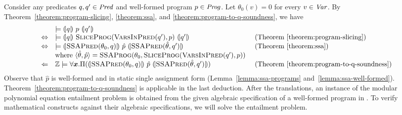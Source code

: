 
Consider any predicates $q, q' \in \mathit{Pred}$ and well-formed program $p \in
\mathit{Prog}$. Let $\theta_0 (v) = 0$ for every $v \in \mathit{Var}$. By
Theorem~\ref{theorem:program-slicing}, \ref{theorem:ssa}, and
\ref{theorem:program-to-q-soundness}, we have
\vspace{-.5em}
\begin{equation*}
  \begin{array}{cll}
    & \models \hoaretriple{q}{p}{q'}\\
    \Leftrightarrow
    & \models 
      \hoaretriple{q}{\textsc{SliceProg}(\textsc{VarsInPred}(q'), p)}{q'}
    & \textmd{ (Theorem~\ref{theorem:program-slicing})}\\
    \Leftrightarrow
    & \models
      \hoaretriple{\textsc{SSAPred}(\theta_0, q)}
      {\hat{p}}
      {\textsc{SSAPred}(\hat{\theta}, q')}
    & \textmd{ (Theorem~\ref{theorem:ssa})}\\
    &
      \textmd{where } \langle \hat{\theta}, \hat{p} \rangle = 
      \textsc{SSAProg} (\theta_0, \textsc{SliceProg}
      (\textsc{VarsInPred}(q'), p))\\
    \Leftarrow
    & \bbfZ \models \forall \vx.
      \Pi (\hoaretriple{\textsc{SSAPred}(\theta_0, q)} {\hat{p}}
      {\textsc{SSAPred}(\hat{\theta}, q')})
    & \textmd{ (Theorem~\ref{theorem:program-to-q-soundness})}
  \end{array}
\end{equation*}
Observe that $\hat{p}$ is well-formed and in static single assignment
form (Lemma~\ref{lemma:ssa-programs} and~\ref{lemma:ssa-well-formed}).
Theorem~\ref{theorem:program-to-q-soundness} is applicable in the last
deduction. After the translations, an instance of the modular
polynomial equation entailment problem is obtained from the given
algebraic specification of a well-formed program in \mydsl. 
To verify mathematical constructs against their algebraic
specifications, we will solve the entailment problem.